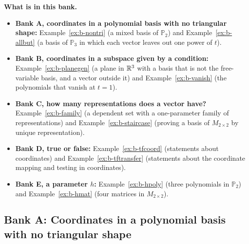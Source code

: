 \documentclass[11pt]{article}
\begin{document}
\textbf{What is in this bank.}
\begin{itemize}
  \item \textbf{Bank A, coordinates in a polynomial basis with no triangular shape:} Example~\ref{ex:b-nontri} (a mixed basis of $\mathbb{P}_2$) and Example~\ref{ex:b-allbut} (a basis of $\mathbb{P}_3$ in which each vector leaves out one power of $t$).
  \item \textbf{Bank B, coordinates in a subspace given by a condition:} Example~\ref{ex:b-planegen} (a plane in $\mathbb{R}^3$ with a basis that is not the free-variable basis, and a vector outside it) and Example~\ref{ex:b-vanish} (the polynomials that vanish at $t=1$).
  \item \textbf{Bank C, how many representations does a vector have?} Example~\ref{ex:b-family} (a dependent set with a one-parameter family of representations) and Example~\ref{ex:b-staircase} (proving a basis of $M_{2\times2}$ by unique representation).
  \item \textbf{Bank D, true or false:} Example~\ref{ex:b-tfcoord} (statements about coordinates) and Example~\ref{ex:b-tftransfer} (statements about the coordinate mapping and testing in coordinates).
  \item \textbf{Bank E, a parameter $h$:} Example~\ref{ex:b-hpoly} (three polynomials in $\mathbb{P}_2$) and Example~\ref{ex:b-hmat} (four matrices in $M_{2\times2}$).
\end{itemize}

\subsection*{Bank A: Coordinates in a polynomial basis with no triangular shape}
\end{document}
